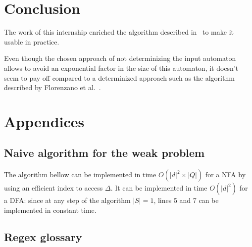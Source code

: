 \documentclass[12px]{article}
\theoremstyle{definition}
\newcommand{\Span}[1]{\left[ #1 \right\rangle}
\begin{document}


  \section{Conclusion}

    The work of this internship enriched the algorithm described
    in~\cite{ICDT19} to make it usable in practice.

    Even though the chosen approach of not determinizing the input automaton
    allows to avoid an exponential factor in the size of this automaton, it
    doesn't seem to pay off compared to a determinized approach such as the
    algorithm described by Florenzano et al.~\cite{florenzano2018constant}.

  \pagebreak
  
  


  \pagebreak
  \section*{Appendices}


    \subsection{Naive algorithm for the weak problem}

      The algorithm bellow can be implemented in time $O(|d|^2 \times |Q|)$ for
      a NFA by using an efficient index to access $\Delta$. It can be
      implemented in time $O(|d|^2)$ for a DFA\@: since at any step of the
      algorithm $|S| = 1$, lines 5 and 7 can be implemented in constant time.

      \begin{algorithm}[H]%
        \label{alg:naive}
        \begin{algorithmic}[1]
                \State{%
                  $\texttt{output} \gets \texttt{output} \uplus \{\Span{i,
                  j}\}$
                }
              \EndIf{}
            \EndFor{}
          \EndFor{}
        \end{algorithmic}
        \caption{%
          A naive quadratic algorithm for Problem~\ref{pb:weak} with inputs
          $\mathcal{A} = (Q, I, \Delta, F)$ and $d \in \Sigma^*$
        }
      \end{algorithm}

    \subsection{Regex glossary}%
      \label{sec:regex_glossary}
\end{document}
